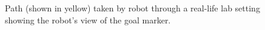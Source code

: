 				\begin{figure}[!h]
					\centering
					\caption{Path (shown in yellow) taken by robot through a real-life lab setting showing the robot's view of the goal marker.}
					\label{fig::potential_field_results_real}
				\end{figure}

